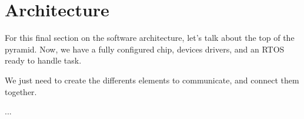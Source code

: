 \section{Architecture}
For this final section on the software architecture, let's talk about the top of the pyramid.
Now, we have a fully configured chip, devices drivers, and an RTOS ready to handle task.

We just need to create the differents elements to communicate, and connect them together.

...